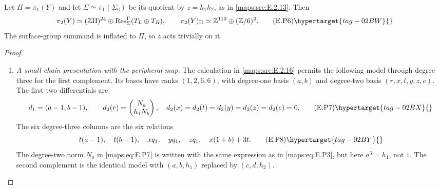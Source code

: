 \begin{theorem}
Let $\Pi=\pi_1(Y)$ and let $\Sigma\simeq\pi_1(\Sigma_6)$
be its quotient by $z=h_1h_2$, as in \ref{maps:src:E.2.13}. Then
\[
 \pi_2(Y)\simeq(\mathbb Z\Pi)^{24}
          \oplus\operatorname{Res}^{\Gamma}_{\Sigma}(T_L\oplus T_R),
 \qquad
 \pi_2(Y)_\Pi\simeq\mathbb Z^{110}\oplus(\mathbb Z/6)^2.
 \tag{E.P6}\hypertarget{tag-02BW}{}\label{maps:eq:E.P6}
\]
The surface-group summand is inflated to $\Pi$, so
$z$ acts trivially on it. \end{theorem}


\begin{proof}
\begin{enumerate}[label={$\langle1\rangle$\arabic*.},leftmargin=*]
\item \emph{A small chain presentation with the peripheral map.}
The calculation in \ref{maps:src:E.2.16} permits the following model
through degree three for the first complement. Its
bases have ranks $(1,2,6,6)$, with degree-one basis
$(a,b)$ and degree-two basis $(r,x,t,y,z,e)$.
The first two differentials are
\[
 d_1=(a-1,b-1),\qquad
 d_2(r)=\begin{pmatrix}N_a\\h_1N_b\end{pmatrix},
 \quad d_2(x)=d_2(t)=d_2(y)=d_2(z)=d_2(e)=0.
 \tag{E.P7}\hypertarget{tag-02BX}{}\label{maps:eq:E.P7}
\]
The six degree-three columns are the six relations
\[
 t(a-1),\quad t(b-1),\quad xq_1,\quad yq_1,\quad zq_1,
                         \quad x(1+b)+3t.
 \tag{E.P8}\hypertarget{tag-02BY}{}\label{maps:eq:E.P8}
\]
The degree-two norm $N_a$ in \eqref{maps:eq:E.P7} is written with
the same expression as in \eqref{maps:eq:E.P3}, but here $a^3=h_1$,
not $1$. The second complement is the identical
model with $(a,b,h_1)$ replaced by $(c,d,h_2)$.


\end{enumerate}
\end{proof}
